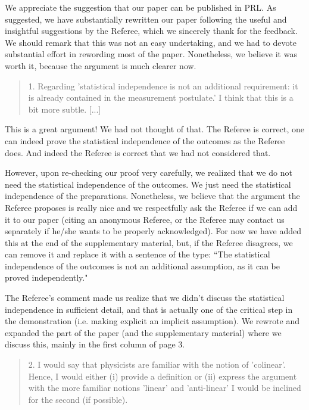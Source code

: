 \documentclass[11pt]{article}
\begin{document}
We appreciate the suggestion that our paper can be published in
PRL. As suggested, we have substantially rewritten our paper following
the useful and insightful suggestions by the Referee, which we
sincerely thank for the feedback. We should remark that this was not
an easy undertaking, and we had to devote substantial effort in
rewording most of the paper. Nonetheless, we believe it was worth it,
because the argument is much clearer now.

\begin{quote}
1. Regarding 'statistical independence is not an
additional requirement: it is already contained in the measurement
postulate.' I think that this is a bit more subtle. [...]
\end{quote}

This is a great argument! We had not thought of that. The Referee is
correct, one can indeed prove the statistical independence of the
outcomes as the Referee does. And indeed the Referee is correct that
we had not considered that.

However, upon re-checking our proof very carefully, we realized that
we do not need the statistical independence of the outcomes. We just
need the statistical independence of the preparations. Nonetheless, we
believe that the argument the Referee proposes is really nice and we
respectfully ask the Referee if we can add it to our paper (citing an
anonymous Referee, or the Referee may contact us separately if he/she
wants to be properly acknowledged). For now we have added this at the end of the
supplementary material, but, if the Referee disagrees, we can remove
it and replace it with a sentence of the type: ``The statistical
independence of the outcomes is not an additional assumption, as it
can be proved independently."

The Referee's comment made us realize that we didn't discuss the
statistical independence in sufficient detail, and that is actually
one of the critical step in the demonstration (i.e. making explicit an
implicit assumption). We rewrote and expanded the part of the paper
(and the supplementary material) where we discuss this, mainly in the
first column of page 3.

\begin{quote}
2. I would say that physicists are familiar with the
notion of 'colinear'.  Hence, I would either (i) provide a definition
or (ii) express the argument with the more familiar notions 'linear'
and 'anti-linear' I would be inclined for the second (if possible).
\end{quote}
\end{document}
